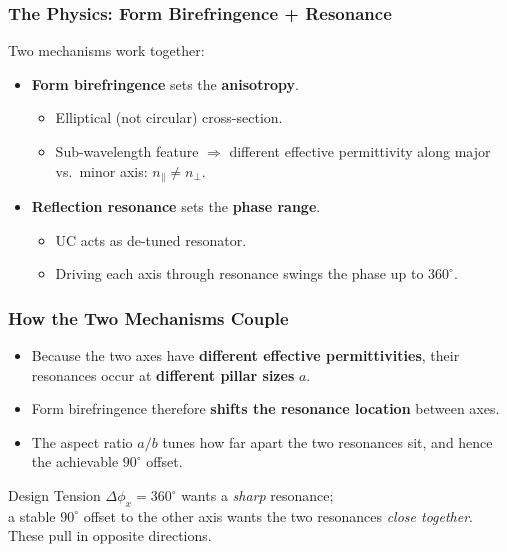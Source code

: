 \documentclass[aspectratio=43]{beamer}
\begin{document}
\begin{frame}[fragile]
  \frametitle{The Physics: Form Birefringence + Resonance}
  Two mechanisms work together:
  \begin{itemize}
    \item \textbf{Form birefringence} sets the \textbf{anisotropy}.
      \begin{itemize}
        \item Elliptical (not circular) cross-section.
        \item Sub-wavelength feature $\Rightarrow$ different effective
          permittivity along major vs.\ minor axis:
          $n_{\parallel} \neq n_{\perp}$.
      \end{itemize}
    \item \textbf{Reflection resonance} sets the \textbf{phase range}.
      \begin{itemize}
        \item UC acts as de-tuned resonator.
        \item Driving each axis through resonance swings the phase up to
          $360^\circ$.
      \end{itemize}
  \end{itemize}
\end{frame}

\begin{frame}[fragile]
  \frametitle{How the Two Mechanisms Couple}
  \begin{itemize}
    \item Because the two axes have \textbf{different effective permittivities},
      their resonances occur at \textbf{different pillar sizes} $a$.
    \item Form birefringence therefore \textbf{shifts the resonance location}
      between axes.
    \item The aspect ratio $a/b$ tunes how far apart the two resonances sit,
      and hence the achievable $90^\circ$ offset.
  \end{itemize}
  \begin{alertblock}{Design Tension}
    $\Delta\phi_x = 360^\circ$ wants a \emph{sharp} resonance;\\
    a stable $90^\circ$ offset to the other axis wants the two resonances
    \emph{close together}. These pull in opposite directions.
  \end{alertblock}
\end{frame}
\end{document}

